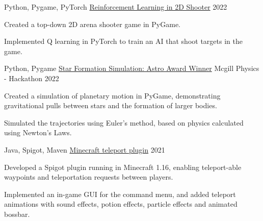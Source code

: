 

\begin{cventries}

  \cventry
    {Python, Pygame, PyTorch} %
    {\href{https://github.com/shiqui/TSDP-Reinforcement-Learning-in-Video-Games}{Reinforcement Learning in 2D Shooter}} %
    {} %
    {2022} %
    {
      \begin{cvitems} %
        \item {Created a top-down 2D arena shooter game in PyGame.}
        \item {Implemented Q learning in PyTorch to train an AI that shoot targets in the game.}
      \end{cvitems}
    }

  \cventry
    {Python, Pygame} %
    {\href{https://devpost.com/software/star-formation}{Star Formation Simulation: Astro Award Winner}} %
    {Mcgill Physics - Hackathon} %
    {2022} %
    {
      \begin{cvitems} %
        \item {Created a simulation of planetary motion in PyGame, demonstrating gravitational pulls between stars and the formation of larger bodies. }
        \item {Simulated the trajectories using Euler's method, based on physics calculated using Newton's Laws. }
      \end{cvitems}
    }
    
  \cventry
    {Java, Spigot, Maven} %
    {\href{https://github.com/shiqui/Teleport-Plugin}{Minecraft teleport plugin}} %
    {} %
    {2021} %
    {
      \begin{cvitems} %
        \item {Developed a Spigot plugin running in Minecraft 1.16, enabling teleport-able waypoints and teleportation requests between players.}
        \item {Implemented an in-game GUI for the command menu, and added teleport animations with sound effects, potion effects, particle effects and animated bossbar.}
      \end{cvitems}
    }


\end{cventries}
